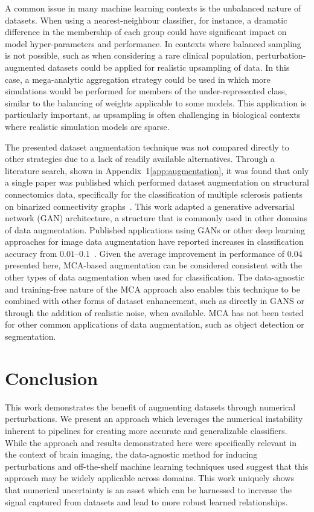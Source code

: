 \documentclass[10pt]{SelfArx} %
\newcommand{\new}[1]{\color{blue}#1\color{black}\xspace}
\begin{document}
A common issue in many machine learning contexts is the unbalanced nature of datasets. When using a nearest-neighbour
classifier, for instance, a dramatic difference in the membership of each group could have significant impact on model
hyper-parameters and performance. In contexts where balanced sampling is not possible, such as when considering a rare
clinical population, perturbation-augmented datasets could be applied for realistic upsampling of data. In this case, a
mega-analytic aggregation strategy could be used in which more simulations would be performed for members of the
under-represented class, similar to the balancing of weights applicable to some models. This application is
particularly important, as upsampling is often challenging in biological contexts where realistic simulation models are
sparse.

\new{The presented dataset augmentation technique was not compared directly to other strategies due to a lack of
readily available alternatives. Through a literature search, shown in Appendix~1\ref{app:augmentation}, it was found
that only a single paper was published which performed dataset augmentation on structural connectomics data,
specifically for the classification of multiple sclerosis patients on binarized connectivity
graphs~\cite{barile2021data}. This work adapted a generative adversarial network (GAN) architecture, a structure that
is commonly used in other domains of data augmentation. Published applications using GANs or other deep learning
approaches for image data augmentation have reported increases in classification accuracy from
$0.01–0.1$~\cite{shorten2019survey}. Given the average improvement in performance of $0.04$ presented here, MCA-based
augmentation can be considered consistent with the other types of data augmentation when used for classification. The
data-agnostic and training-free nature of the MCA approach also enables this technique to be combined with other forms
of dataset enhancement, such as directly in GANS or through the addition of realistic noise, when available. MCA has
not been tested for other common applications of data augmentation, such as object detection or segmentation.}


\section*{Conclusion}

This work demonstrates the benefit of augmenting datasets through numerical perturbations. We present an approach which
leverages the numerical instability inherent to pipelines for creating more accurate and generalizable classifiers.
While the approach and results demonstrated here were specifically relevant in the context of brain imaging, the
data-agnostic method for inducing perturbations and off-the-shelf machine learning techniques used suggest that this
approach may be widely applicable across domains. This work uniquely shows that numerical uncertainty is an asset which
can be harnessed to increase the signal captured from datasets and lead to more robust learned relationships.
\end{document}
